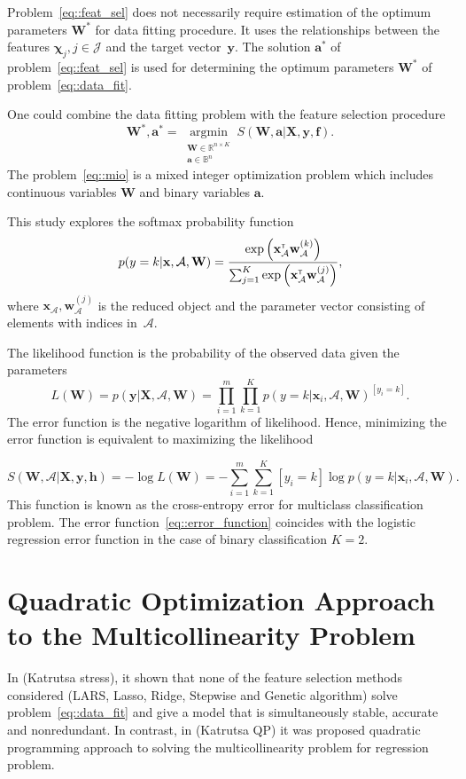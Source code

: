 \documentclass[a4paper,12pt]{article}
\theoremstyle{plain} %
\theoremstyle{definition} %
\theoremstyle{remark} %
\newcommand{\bw}{\mathbf{w}}
\newcommand{\bW}{\mathbf{W}}
\newcommand{\bx}{\mathbf{x}}
\newcommand{\bX}{\mathbf{X}}
\newcommand{\by}{\mathbf{y}}
\newcommand{\ba}{\mathbf{a}}
\newcommand{\cA}{\mathcal{A}}
\newcommand{\bchi}{\boldsymbol{\chi}}
\newcommand{\T}{{\text{\tiny\sffamily\upshape\mdseries T}}}
\newcommand{\argmin}{\mathop{\arg \min}\limits}
\begin{document}
	Problem~\eqref{eq::feat_sel} does not necessarily require estimation of the optimum parameters $\bW^*$ for data fitting procedure.
	It uses the relationships between the features $\bchi_j, j \in \mathcal{J}$ and the target vector~$\by$.  The solution $\mathbf{a}^*$ of problem~\eqref{eq::feat_sel} is used for determining the optimum parameters $\bW^*$ of problem~\eqref{eq::data_fit}.
	
	One could combine the data fitting problem with the feature selection procedure
	\begin{equation}
		\bW^*, \ba^* = \argmin_{\substack{\bW \in \mathbb{R}^{n \times K} \\ \ba \in \mathbb{B}^{n}}} S\left(\bW, \ba | \bX, \by, \mathbf{f}\right).
		\label{eq::mio}
	\end{equation}
	The problem~\eqref{eq::mio} is a mixed integer optimization problem which includes continuous variables $\bW$ and binary variables $\ba$.
	
	This study explores the softmax probability function
	\[
	p(y=k | \bx, \cA, \bW) = \frac{\exp\left(\bx_{\cA}^{\T} \bw_{\cA}^{(k)}\right)}{\sum_{j=1}^K \exp \left( \bx_{\cA}^{\T} \bw_{\cA}^{(j)} \right)},
	\]
	where $\bx_{\cA}, \bw^{(j)}_{\cA}$ is the reduced object and the parameter vector consisting of elements with indices in~$\cA$. 
	
	The likelihood function is the probability of the observed data given the parameters 
	\[
		L(\bW) = p\left(\by | \bX, \cA, \bW \right) = \prod_{i=1}^m \prod_{k=1}^K p(y = k| \bx_i, \cA, \bW)^{[y_i=k]}.
	\]
	The error function is the negative logarithm of likelihood. Hence, minimizing the error function is equivalent to maximizing the likelihood
	
	\begin{equation}
		S(\bW, \cA |\bX, \mathbf{y}, \mathbf{h}) = -\log L(\bW) = - \sum_{i=1}^m \sum_{k=1}^{K} [y_i=k] \log p(y=k | \bx_i, \cA, \bW).
		\label{eq::error_function}
	\end{equation}
	This function is known as the cross-entropy error for multiclass classification problem. 
	The error function~\eqref{eq::error_function} coincides with the logistic regression error function in the case of binary classification $K = 2$.
	
	\section{Quadratic Optimization Approach to the Multicollinearity Problem}
	In (Katrutsa stress), it shown that none of the  feature selection methods considered (LARS, Lasso, Ridge, Stepwise and Genetic algorithm) solve problem~\eqref{eq::data_fit} and give a model that is simultaneously stable, accurate and nonredundant.
	In contrast, in (Katrutsa QP) it was proposed quadratic programming approach to solving the multicollinearity problem for regression problem.
	
\end{document}
